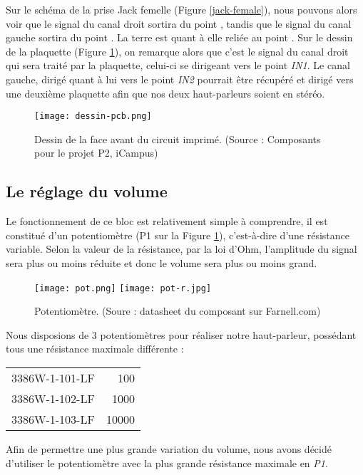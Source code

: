 Sur le schéma de la prise Jack femelle (Figure \ref{jack-female}), nous pouvons alors
voir que le signal du canal droit sortira du point , tandis que le signal du 
canal gauche sortira du point . La terre est quant à elle reliée au point
. Sur le dessin de la plaquette (Figure \ref{dessin-pcb}), on remarque alors
que c'est le signal du canal droit qui sera traité par la plaquette, celui-ci se dirigeant vers
le point \textit{IN1}. Le canal gauche, dirigé quant à lui vers le point \textit{IN2} pourrait
être récupéré et dirigé vers une deuxième plaquette afin que nos deux haut-parleurs soient en stéréo.

\begin{figure}[!hbt]
	\centering
	\texttt{[image: dessin-pcb.png]}
	\caption{Dessin de la face avant du circuit imprimé. (Source : Composants pour le projet P2, iCampus)}
	\label{dessin-pcb}
\end{figure}

\subsection{Le réglage du volume}
Le fonctionnement de ce bloc est relativement simple à comprendre, il est constitué d'un potentiomètre 
(P1 sur la Figure \ref{dessin-pcb}), c'est-à-dire d'une résistance variable.
Selon la valeur de la résistance, par la loi d'Ohm, l'amplitude du signal
sera plus ou moins réduite et donc le volume sera plus ou moins grand.

\begin{figure}[!hbt]
	\centering
	\texttt{[image: pot.png]}
	\texttt{[image: pot-r.jpg]}
	\caption{Potentiomètre. (Soure : datasheet du composant sur Farnell.com)}
	\label{bloc2}
\end{figure}

Nous disposions de 3 potentiomètres pour réaliser notre haut-parleur, possédant
tous une résistance maximale différente :

\begin{center}
	\begin{tabular}{l|r}
	3386W-1-101-LF & \unit{100}{\ohm} \\
	3386W-1-102-LF & \unit{1000}{\ohm} \\
	3386W-1-103-LF & \unit{10000}{\ohm} 
	\end{tabular}
\end{center}

Afin de permettre une plus grande variation du volume, nous avons décidé d'utiliser
le potentiomètre avec la plus grande résistance maximale en \textit{P1}.

